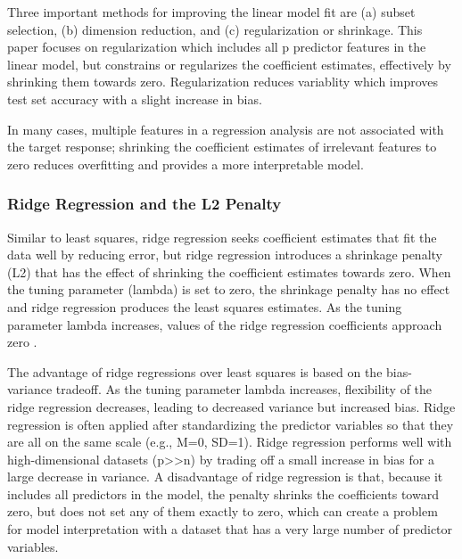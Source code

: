 \documentclass[sigconf]{acmart}
\begin{document}
Three
important methods for improving the linear model fit are (a) subset selection,
(b) dimension reduction, and (c) regularization or shrinkage. This paper 
focuses on regularization which includes all p predictor features in the
linear model, but constrains or regularizes the coefficient estimates, 
effectively by shrinking them towards zero. Regularization reduces variablity 
which improves test set accuracy with a slight increase in bias. 

In many cases, 
multiple features in a regression analysis are not associated with the target
response; shrinking the coefficient estimates of irrelevant features to zero 
reduces overfitting and provides a more interpretable model. 

\subsubsection{Ridge Regression and the L2 Penalty} 

Similar to least squares, ridge regression seeks coefficient estimates that
fit the data well by reducing error, but ridge regression introduces a 
shrinkage penalty (L2) that has the effect of shrinking the coefficient 
estimates towards zero. When the tuning parameter (lambda) is set to zero, 
the shrinkage penalty has no effect and ridge regression produces the least
squares estimates. As the tuning parameter lambda increases, values of the 
ridge regression coefficients approach zero \cite{statlearn13}. 

The advantage of ridge 
regressions over least squares is based on the bias-variance tradeoff. As 
the tuning parameter lambda increases, flexibility of the ridge regression 
decreases, leading to decreased variance but increased bias. Ridge regression 
is often applied after standardizing the predictor variables so that they are 
all on the same scale (e.g., M=0, SD=1). Ridge regression performs 
well with high-dimensional datasets (p>>n) by trading off a small increase
in bias for a large decrease in variance. A disadvantage of ridge regression 
is that, because it includes all predictors in the model, the penalty shrinks
the coefficients toward zero, but does not set any of them exactly to zero, 
which can create a problem for model interpretation with a dataset that
has a very large number of predictor variables. 

\end{document}

